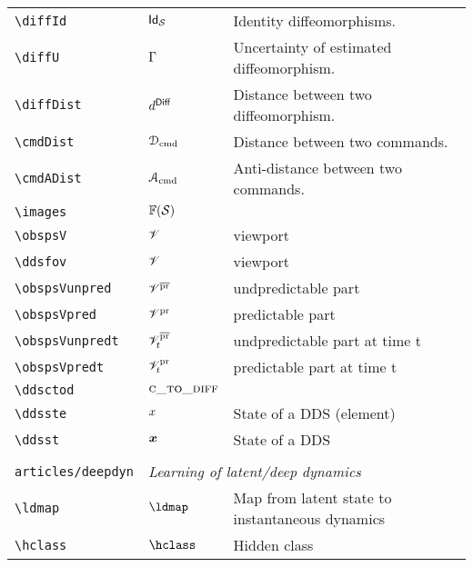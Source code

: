 \begin{longtable}{lll}
 {\color[rgb]{0.5,0.5,0.5}\texttt{\textbackslash diffId}} & $\diffId$ &  Identity diffeomorphisms.\\ 
 {\color[rgb]{0.5,0.5,0.5}\texttt{\textbackslash diffU}} & $\Gamma$ &  Uncertainty of estimated diffeomorphism.\\ 
 {\color[rgb]{0.5,0.5,0.5}\texttt{\textbackslash diffDist}} & $d^{\mathsf{Diff}}$ &  Distance between two diffeomorphism.\\ 
 {\color[rgb]{0.5,0.5,0.5}\texttt{\textbackslash cmdDist}} & $\mathcal{D}_{\text{cmd}}$ &  Distance between two commands.\\ 
 {\color[rgb]{0.5,0.5,0.5}\texttt{\textbackslash cmdADist}} & $\mathcal{A}_{\text{cmd}}$ &  Anti-distance between two commands.\\ 
 {\color[rgb]{0.5,0.5,0.5}\texttt{\textbackslash images}} & $\images$ & \\ 
 {\color[rgb]{0.5,0.5,0.5}\texttt{\textbackslash obspsV}} & $\mathscr{V}$ &  viewport\\ 
 {\color[rgb]{0.5,0.5,0.5}\texttt{\textbackslash ddsfov}} & $\mathscr{V}$ &  viewport\\ 
 {\color[rgb]{0.5,0.5,0.5}\texttt{\textbackslash obspsVunpred}} & $\mathscr{V}^{\overline{\text{pr}}}$ &  undpredictable part\\ 
 {\color[rgb]{0.5,0.5,0.5}\texttt{\textbackslash obspsVpred}} & $\mathscr{V}^\text{pr}$ &  predictable part \\ 
 {\color[rgb]{0.5,0.5,0.5}\texttt{\textbackslash obspsVunpredt}} & $\mathscr{V}_t^{\overline{\text{pr}}}$ &  undpredictable part at time t\\ 
 {\color[rgb]{0.5,0.5,0.5}\texttt{\textbackslash obspsVpredt}} & $\mathscr{V}_t^\text{pr}$ &  predictable part at time t\\ 
 {\color[rgb]{0.5,0.5,0.5}\texttt{\textbackslash ddsctod}} & $\textsc{c\_to\_diff}$ & \\ 
 {\color[rgb]{0.5,0.5,0.5}\texttt{\textbackslash ddsste}} & $x$ &  State of a DDS (element)\\ 
 {\color[rgb]{0.5,0.5,0.5}\texttt{\textbackslash ddsst}} & $\boldsymbol{x}$ &  State of a DDS\\ 
  &  & \\ 
 {\color[rgb]{0.5,0.5,0.5}\texttt{articles/deepdyn}} & \multicolumn{2}{l}{\emph{Learning of latent/deep dynamics}}\\ 
 \hline
{\color[rgb]{0.5,0.5,0.5}\texttt{\textbackslash ldmap}} & $\ldmap$ &  Map from latent state to instantaneous dynamics\\ 
 {\color[rgb]{0.5,0.5,0.5}\texttt{\textbackslash hclass}} & $\hclass$ &  Hidden class\\ 

\end{longtable}
